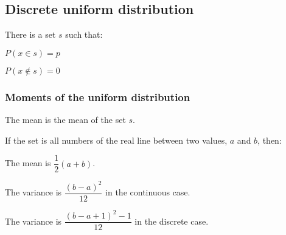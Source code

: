 
\subsection{Discrete uniform distribution}

There is a set \(s\) such that:

\(P(x\in s)=p\)

\(P(x\not\in s)=0\)

\subsubsection{Moments of the uniform distribution}

The mean is the mean of the set \(s\).

If the set is all numbers of the real line between two values, \(a\) and \(b\), then:

The mean is \(\dfrac{1}{2}(a+b)\).

The variance is \(\dfrac{(b-a)^2}{12}\) in the continuous case.

The variance is \(\dfrac{(b-a+1)^2-1}{12}\) in the discrete case.

